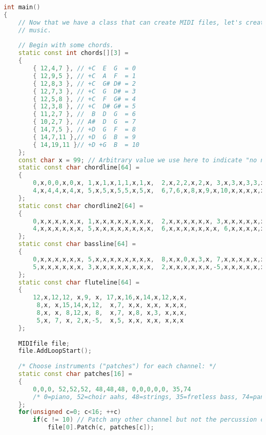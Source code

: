 \documentclass[a4paper]{report}
\begin{document}
\begin{lstlisting}[language=C++, caption=CPP MIDI,captionpos=b]
int main()
{
    // Now that we have a class that can create MIDI files, let's create
    // music.
    
    // Begin with some chords.
    static const int chords[][3] =
    {
        { 12,4,7 }, // +C  E  G  = 0
        { 12,9,5 }, // +C  A  F  = 1
        { 12,8,3 }, // +C  G# D# = 2
        { 12,7,3 }, // +C  G  D# = 3
        { 12,5,8 }, // +C  F  G# = 4
        { 12,3,8 }, // +C  D# G# = 5
        { 11,2,7 }, //  B  D  G  = 6
        { 10,2,7 }, // A#  D  G  = 7
        { 14,7,5 }, // +D  G  F  = 8
        { 14,7,11 },// +D  G  B  = 9
        { 14,19,11 }// +D +G  B  = 10
    };
    const char x = 99; // Arbitrary value we use here to indicate "no note"
    static const char chordline[64] =
    {
        0,x,0,0,x,0,x, 1,x,1,x,1,1,x,1,x,  2,x,2,2,x,2,x, 3,x,3,x,3,3,x,3,x,
        4,x,4,4,x,4,x, 5,x,5,x,5,5,x,5,x,  6,7,6,x,8,x,9,x,10,x,x,x,x,x,x,x
    };
    static const char chordline2[64] =
    {
        0,x,x,x,x,x,x, 1,x,x,x,x,x,x,x,x,  2,x,x,x,x,x,x, 3,x,x,x,x,x,x,x,x,
        4,x,x,x,x,x,x, 5,x,x,x,x,x,x,x,x,  6,x,x,x,x,x,x,x, 6,x,x,x,x,x,x,x
    };
    static const char bassline[64] =
    {
        0,x,x,x,x,x,x, 5,x,x,x,x,x,x,x,x,  8,x,x,0,x,3,x, 7,x,x,x,x,x,x,x,x,
        5,x,x,x,x,x,x, 3,x,x,x,x,x,x,x,x,  2,x,x,x,x,x,x,-5,x,x,x,x,x,x,x,x
    };
    static const char fluteline[64] =
    {
        12,x,12,12, x,9, x, 17,x,16,x,14,x,12,x,x,
         8,x, x,15,14,x,12,  x,7, x,x, x,x, x,x,x,
         8,x, x, 8,12,x, 8,  x,7, x,8, x,3, x,x,x,
         5,x, 7, x, 2,x,-5,  x,5, x,x, x,x, x,x,x
    };
    
    MIDIfile file;
    file.AddLoopStart();
    
    /* Choose instruments ("patches") for each channel: */
    static const char patches[16] =
    {
        0,0,0, 52,52,52, 48,48,48, 0,0,0,0,0, 35,74
        /* 0=piano, 52=choir aahs, 48=strings, 35=fretless bass, 74=pan flute */
    };
    for(unsigned c=0; c<16; ++c)
        if(c != 10) // Patch any other channel but not the percussion channel.
            file[0].Patch(c, patches[c]);
    

\end{lstlisting}
\end{document}

